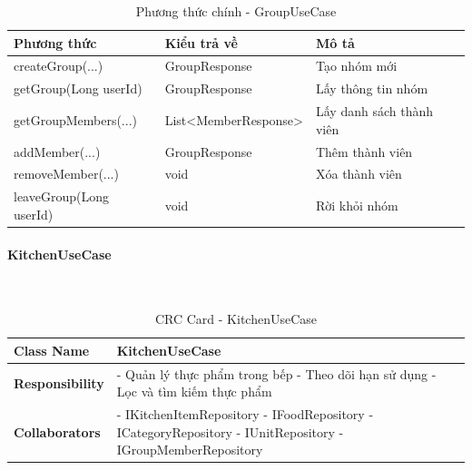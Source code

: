 \begin{table}[H]
\small
\renewcommand{\arraystretch}{1.3}
\begin{tabularx}{\textwidth}{|>{\raggedright\arraybackslash}p{5cm}|>{\raggedright\arraybackslash}p{3.5cm}|X|}
\hline
\rowcolor{gray!20}
\textbf{Phương thức} & \textbf{Kiểu trả về} & \textbf{Mô tả} \\
\hline
createGroup(...) & GroupResponse & Tạo nhóm mới \\
\hline
getGroup(Long userId) & GroupResponse & Lấy thông tin nhóm \\
\hline
getGroupMembers(...) & List<MemberResponse> & Lấy danh sách thành viên \\
\hline
addMember(...) & GroupResponse & Thêm thành viên \\
\hline
removeMember(...) & void & Xóa thành viên \\
\hline
leaveGroup(Long userId) & void & Rời khỏi nhóm \\
\hline
\end{tabularx}
\caption{Phương thức chính - GroupUseCase}
\end{table}

\paragraph{KitchenUseCase} ~\\

\begin{table}[H]
\small
\renewcommand{\arraystretch}{1.3}
\begin{tabularx}{\textwidth}{|>{\raggedright\arraybackslash}p{3.5cm}|X|}
\hline
\rowcolor{gray!20}
\textbf{Class Name} & KitchenUseCase \\
\hline
\textbf{Responsibility} & - Quản lý thực phẩm trong bếp \newline - Theo dõi hạn sử dụng \newline - Lọc và tìm kiếm thực phẩm \\
\hline
\textbf{Collaborators} & - IKitchenItemRepository \newline - IFoodRepository \newline - ICategoryRepository \newline - IUnitRepository \newline - IGroupMemberRepository \\
\hline
\end{tabularx}
\caption{CRC Card - KitchenUseCase}
\end{table}

